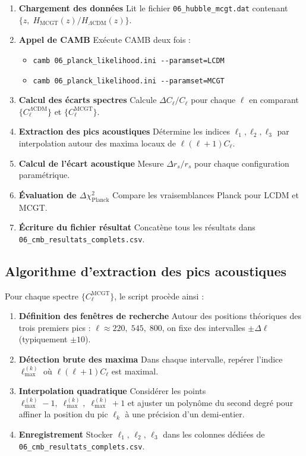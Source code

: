 \begin{enumerate}[label=\arabic*.]
  \item \textbf{Chargement des données}
    Lit le fichier \texttt{06\_hubble\_mcgt.dat} contenant
    \(\{z,\;H_{\mathrm{MCGT}}(z)/H_{\Lambda\mathrm{CDM}}(z)\}\).
  \item \textbf{Appel de CAMB}
    Exécute CAMB deux fois :
    \begin{itemize}
      \item \verb|camb 06_planck_likelihood.ini --paramset=LCDM|
      \item \verb|camb 06_planck_likelihood.ini --paramset=MCGT|
    \end{itemize}
  \item \textbf{Calcul des écarts spectres}
    Calcule \(\Delta C_{\ell}/C_{\ell}\) pour chaque \(\ell\) en comparant
    \(\{C_{\ell}^{\Lambda\mathrm{CDM}}\}\) et \(\{C_{\ell}^{\mathrm{MCGT}}\}\).
  \item \textbf{Extraction des pics acoustiques}
    Détermine les indices \(\ell_{1},\ell_{2},\ell_{3}\) par interpolation
    autour des maxima locaux de \(\ell(\ell+1)C_{\ell}\).
  \item \textbf{Calcul de l’écart acoustique}
    Mesure \(\Delta r_{s}/r_{s}\) pour chaque configuration paramétrique.
  \item \textbf{Évaluation de \(\Delta\chi^{2}_{\mathrm{Planck}}\)}
    Compare les vraisemblances Planck pour LCDM et MCGT.
  \item \textbf{Écriture du fichier résultat}
    Concatène tous les résultats dans
    \texttt{06\_cmb\_resultats\_complets.csv}.
\end{enumerate}

\subsection{Algorithme d’extraction des pics acoustiques}

Pour chaque spectre \(\{C_{\ell}^{\mathrm{MCGT}}\}\), le script procède ainsi :

\begin{enumerate}[label=\arabic*.]
  \item \textbf{Définition des fenêtres de recherche}
    Autour des positions théoriques des trois premiers pics :
    \(\ell \approx 220,\;545,\;800\), on fixe des intervalles \(\pm\Delta\ell\) (typiquement \(\pm10\)).
  \item \textbf{Détection brute des maxima}
    Dans chaque intervalle, repérer l’indice \(\ell_{\max}^{(k)}\) où \(\ell(\ell+1)C_{\ell}\) est maximal.
  \item \textbf{Interpolation quadratique}
    Considérer les points \(\ell_{\max}^{(k)} - 1,\;\ell_{\max}^{(k)},\;\ell_{\max}^{(k)} + 1\) et ajuster un polynôme du second degré pour affiner la position du pic \(\ell_{k}\) à une précision d’un demi-entier.
  \item \textbf{Enregistrement}
    Stocker \(\ell_{1},\,\ell_{2},\,\ell_{3}\) dans les colonnes dédiées de \texttt{06\_cmb\_resultats\_complets.csv}.
\end{enumerate}

